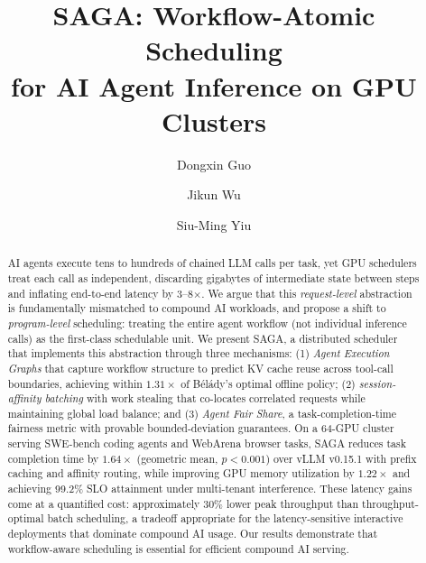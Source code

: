 \documentclass[sigconf]{acmart}
\newcommand{\sysname}{SAGA\xspace}
\begin{document}
\title[SAGA: Workflow-Atomic Scheduling for AI Agent Inference on GPU Clusters]{SAGA: Workflow-Atomic Scheduling \\ for AI Agent Inference on GPU Clusters}

\author{Dongxin Guo}

\author{Jikun Wu}
\authornotemark[1]

\author{Siu-Ming Yiu}

\renewcommand{\shortauthors}{D. Guo, J. Wu, and S. M. Yiu}

\begin{abstract}
	AI agents execute tens to hundreds of chained LLM calls per task, yet GPU schedulers treat each call as independent, discarding gigabytes of intermediate state between steps and inflating end-to-end latency by 3--8$\times$. We argue that this \emph{request-level} abstraction is fundamentally mismatched to compound AI workloads, and propose a shift to \emph{program-level} scheduling: treating the entire agent workflow (not individual inference calls) as the first-class schedulable unit. We present \sysname, a distributed scheduler that implements this abstraction through three mechanisms: (1) \emph{Agent Execution Graphs} that capture workflow structure to predict KV cache reuse across tool-call boundaries, achieving within $1.31\times$ of B\'{e}l\'{a}dy's optimal offline policy; (2) \emph{session-affinity batching} with work stealing that co-locates correlated requests while maintaining global load balance; and (3) \emph{Agent Fair Share}, a task-completion-time fairness metric with provable bounded-deviation guarantees. On a 64-GPU cluster serving SWE-bench coding agents and WebArena browser tasks, \sysname reduces task completion time by $1.64\times$ (geometric mean, $p < 0.001$) over vLLM v0.15.1 with prefix caching and affinity routing, while improving GPU memory utilization by $1.22\times$ and achieving 99.2\% SLO attainment under multi-tenant interference. These latency gains come at a quantified cost: approximately 30\% lower peak throughput than throughput-optimal batch scheduling, a tradeoff appropriate for the latency-sensitive interactive deployments that dominate compound AI usage. Our results demonstrate that workflow-aware scheduling is essential for efficient compound AI serving.
\end{abstract}
\end{document}

